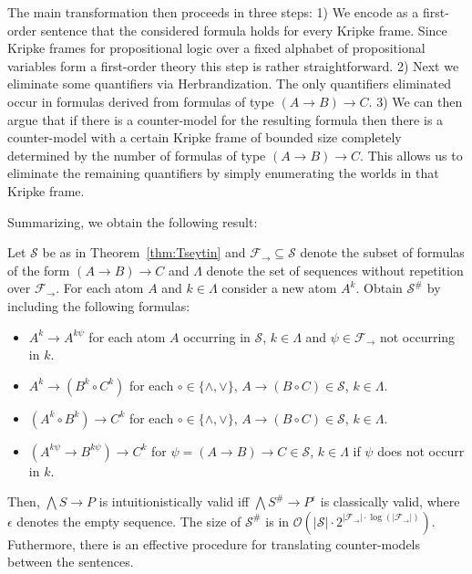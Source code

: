 \documentclass[a4paper,UKenglish,cleveref, autoref, thm-restate]{lipics-v2021}
\begin{document}
The main transformation then proceeds in three steps:
%
1) We encode as a first-order sentence that the considered formula holds for every Kripke frame.
Since Kripke frames for propositional logic over a fixed alphabet of propositional variables form a first-order theory this step is rather straightforward.
%
2) Next we eliminate some quantifiers via Herbrandization. The only quantifiers eliminated occur in formulas derived from formulas of type $(A\to B)\to C$.
%
3) We can then argue that if there is a counter-model for the resulting formula then there is a counter-model with a certain Kripke frame of bounded size completely determined by the number of formulas of type $(A\to B)\to C$.
This allows us to eliminate the remaining quantifiers by simply enumerating the worlds in that Kripke frame.

Summarizing, we obtain the following result:

\begin{theorem}
\label{thm:reduction-propositional}
	Let $\mathcal S$ be as in Theorem~\ref{thm:Tseytin} and $\mathcal F_\to\subseteq\mathcal S$ denote the subset of formulas of the form $(A\to B)\to C$ and $\Lambda$ denote the set of sequences without repetition over $\mathcal F_\to$. For each atom $A$ and $k\in\Lambda$ consider a new atom $A^k$. Obtain $\mathcal S^\#$ by including the following formulas:
	\begin{itemize}
		\item $A^k\to A^{k\psi}$ for each atom $A$ occurring in $\mathcal S$, $k\in\Lambda$ and $\psi\in\mathcal F_\to$ not occurring in $k$.
		\item $A^k\to (B^k\circ C^k)$ for each $\circ\in\{\wedge,\vee\}$, $A\to (B\circ C)\in\mathcal S$, $k\in\Lambda$.
		\item $(A^k\circ B^k)\to C^k$ for each $\circ\in\{\wedge,\vee\}$, $A\to (B\circ C)\in\mathcal S$, $k\in\Lambda$.
		\item $(A^{k\psi}\to B^{k\psi})\to C^k$ for $\psi = (A\to B)\to C\in\mathcal S$, $k\in\Lambda$ if $\psi$ does not occurr in $k$.
	\end{itemize}
Then, $\bigwedge S\to P$ is intuitionistically valid iff $\bigwedge S^\#\to P^\epsilon$ is classically valid, where $\epsilon$ denotes the empty sequence. The size of $\mathcal S^\#$ is in $\mathcal O(|\mathcal S|\cdot2^{|\mathcal F_\to|\cdot\log(|\mathcal F_\to|)})$. Futhermore, there is an effective procedure for translating counter-models between the sentences.
\end{theorem}
\end{document}
